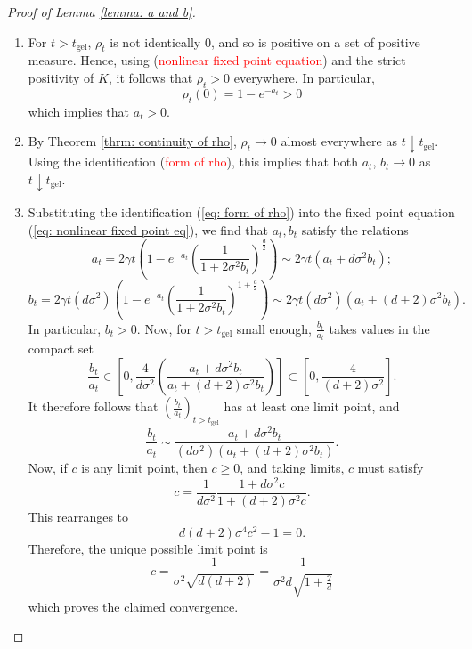\begin{proof}[Proof of Lemma \ref{lemma: a and b}] \begin{enumerate}[label=\roman{*}).]
    \item For $t>t_\text{gel}$, $\rho_t$ is not identically $0$, and so is positive on a set of positive measure. Hence, using (\textcolor{red}{nonlinear fixed point equation}) and the strict positivity of $K$, it follows that $\rho_t>0$ everywhere. In particular, \begin{equation}
        \rho_t(0)=1-e^{-a_t}>0
    \end{equation} which implies that $a_t>0.$
    \item By Theorem \ref{thrm: continuity of rho},  $\rho_t\rightarrow 0$ almost everywhere as $t\downarrow t_\text{gel}$. Using the identification (\textcolor{red}{form of rho}), this implies that both $a_t$, $b_t \rightarrow 0$ as $t\downarrow t_\text{gel}$.
    \item Substituting the identification (\ref{eq: form of rho}) into the fixed point equation (\ref{eq: nonlinear fixed point eq}), we find that $a_t, b_t$ satisfy the relations \begin{equation}
        a_t=2\gamma t\left(1-e^{-a_t}\left(\frac{1}{1+2\sigma^2 b_t}\right)^\frac{d}{2}\right)\sim 2\gamma t(a_t+d\sigma^2 b_t);
    \end{equation}\begin{equation}
        b_t=2\gamma t(d\sigma^2)\left(1-e^{-a_t}\left(\frac{1}{1+2\sigma^2 b_t}\right)^{1+\frac{d}{2}}\right) \sim 2\gamma t(d\sigma^2)(a_t+(d+2)\sigma^2 b_t).
    \end{equation} In particular, $b_t>0$. Now, for $t>t_\text{gel}$ small enough, $\frac{b_t}{a_t}$ takes values in the compact set \begin{equation}
        \frac{b_t}{a_t} \in \left[0, \frac{4}{d\sigma^2}\left(\frac{a_t+d\sigma^2b_t}{a_t+(d+2)\sigma^2b_t}\right)\right] \subset \left[0, \frac{4}{(d+2)\sigma^2}\right].
    \end{equation} It therefore follows that $(\frac{b_t}{a_t})_{t>t_\text{gel}}$ has at least one limit point, and \begin{equation}
        \frac{b_t}{a_t}\sim \frac{a_t+d\sigma^2 b_t}{(d\sigma^2)(a_t+(d+2)\sigma^2 b_t)}.
    \end{equation} Now, if $c$ is any limit point, then $c\geq 0$, and taking limits, $c$ must satisfy \begin{equation}
        c=\frac{1}{d\sigma^2} \frac{1+d\sigma^2 c}{1+(d+2)\sigma^2c}.
    \end{equation} This rearranges to \begin{equation}
        d(d+2)\sigma^4c^2-1=0.
    \end{equation} Therefore, the unique possible limit point is\begin{equation}
        c=\frac{1}{\sigma^2 \sqrt{d(d+2)}}=\frac{1}{\sigma^2 d\sqrt{1+\frac{2}{d}}}
    \end{equation} which proves the claimed convergence.
\end{enumerate}\end{proof}
 \fi